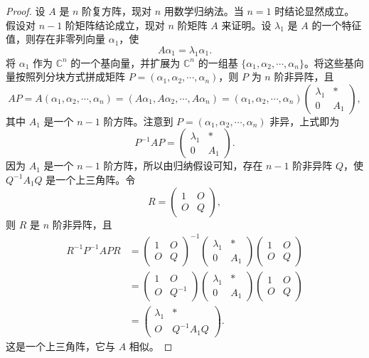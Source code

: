 \documentclass[lang=cn,12pt]{elegantbook}
\begin{document}
\begin{proof}
    设 \( A \) 是 \( n \) 阶复方阵，现对 \( n \) 用数学归纳法。当 \( n = 1 \) 时结论显然成立。假设对 \( n - 1 \) 阶矩阵结论成立，现对 \( n \) 阶矩阵 \( A \) 来证明。设 \( \lambda_1 \) 是 \( A \) 的一个特征值，则存在非零列向量 \( \alpha_1 \)，使
    \[
    A\alpha_1 = \lambda_1 \alpha_1.
    \]
    将 \( \alpha_1 \) 作为 \( \mathbb{C}^n \) 的一个基向量，并扩展为 \( \mathbb{C}^n \) 的一组基 \( \{ \alpha_1, \alpha_2, \cdots, \alpha_n \} \)。将这些基向量按照列分块方式拼成矩阵 \( P = (\alpha_1, \alpha_2, \cdots, \alpha_n) \)，则 \( P \) 为 \( n \) 阶非异阵，且
    \[
    AP = A(\alpha_1, \alpha_2, \cdots, \alpha_n) = (A\alpha_1, A\alpha_2, \cdots, A\alpha_n)
    = (\alpha_1, \alpha_2, \cdots, \alpha_n)
    \begin{pmatrix}
    \lambda_1 & * \\
    0 & A_1
    \end{pmatrix},
    \]
    其中 \( A_1 \) 是一个 \( n - 1 \) 阶方阵。注意到 \( P = (\alpha_1, \alpha_2, \cdots, \alpha_n) \) 非异，上式即为
    \[
    P^{-1}AP = 
    \begin{pmatrix}
    \lambda_1 & * \\
    0 & A_1
    \end{pmatrix}.
    \]
    因为 \( A_1 \) 是一个 \( n - 1 \) 阶方阵，所以由归纳假设可知，存在 \( n - 1 \) 阶非异阵 \( Q \)，使 \( Q^{-1}A_1Q \) 是一个上三角阵。令
    \[
    R = 
    \begin{pmatrix}
    1 & O \\
    O & Q
    \end{pmatrix},
    \]
    则 \( R \) 是 \( n \) 阶非异阵，且
    \[
    \begin{aligned}
    R^{-1}P^{-1}APR &=
    \begin{pmatrix}
    1 & O \\
    O & Q
    \end{pmatrix}^{-1}
    \begin{pmatrix}
    \lambda_1 & * \\
    0 & A_1
    \end{pmatrix}
    \begin{pmatrix}
    1 & O \\
    O & Q
    \end{pmatrix} \\
    &=
    \begin{pmatrix}
    1 & O \\
    O & Q^{-1}
    \end{pmatrix}
    \begin{pmatrix}
    \lambda_1 & * \\
    0 & A_1
    \end{pmatrix}
    \begin{pmatrix}
    1 & O \\
    O & Q
    \end{pmatrix} \\
    &=
    \begin{pmatrix}
    \lambda_1 & * \\
    O & Q^{-1}A_1Q
    \end{pmatrix}.
    \end{aligned}
    \]
    这是一个上三角阵，它与 \( A \) 相似。
\end{proof}
\end{document}
